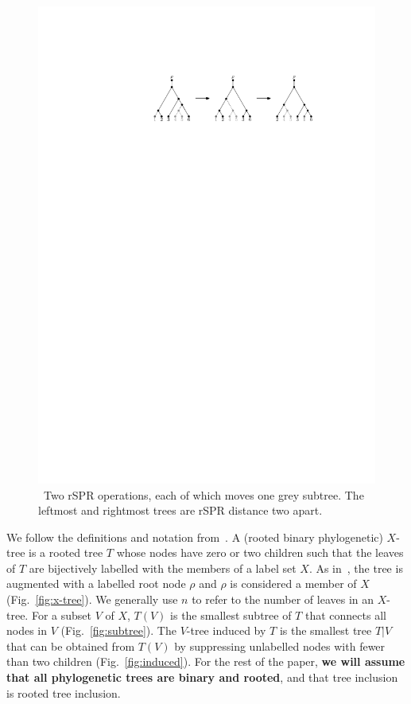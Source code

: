 \documentclass[]{elsarticle}
\let\MYoriglatexcaption\caption
\renewcommand{\caption}[2][\relax]{\MYoriglatexcaption[#2]{#2}}
\begin{document}
\begin{figure}
	\includegraphics[scale=1.25]{figs/two-spr}
	\caption{\
    Two rSPR operations, each of which moves one grey subtree.
    The leftmost and rightmost trees are rSPR distance two apart.}
	\label{fig:two-spr}
\end{figure}


We follow the definitions and notation from~\citep{bordewich05,whidden2013hybridization, Whidden2015-yi}.
A (rooted binary phylogenetic) $X$-tree is a rooted tree $T$ whose nodes have zero or two children such that the leaves of $T$ are bijectively labelled with the members of a label set $X$.
As in~\citep{bordewich05,whidden2013hybridization,Whidden2015-yi}, the tree is augmented with a labelled root node $\rho$ and $\rho$ is considered a member of $X$ (Fig.~\ref{fig:x-tree}).
We generally use $n$ to refer to the number of leaves in an $X$-tree.
For a subset $V$ of $X$, $T(V)$ is the smallest subtree of $T$ that connects all nodes in $V$ (Fig.~\ref{fig:subtree}).
The $V$-tree induced by $T$ is the smallest tree $T|V$ that can be obtained from $T(V)$ by suppressing unlabelled nodes with fewer than two children (Fig.~\ref{fig:induced}).
For the rest of the paper, \textbf{we will assume that all phylogenetic trees are binary and rooted}, and that tree inclusion is rooted tree inclusion.
\end{document}
